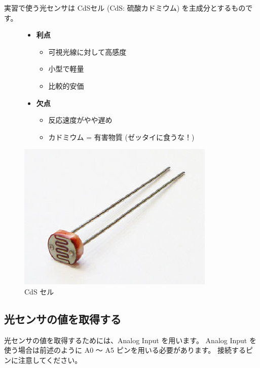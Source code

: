 \documentclass[11pt,a4paper]{jarticle}
\begin{document}
実習で使う光センサは CdSセル (CdS: 硫酸カドミウム) を主成分とするものです。

\begin{figure}[h!]
 \begin{minipage}{0.666\columnwidth}
  \begin{itemize}
   \item \textbf{利点}
	 \begin{itemize}
	  \item 可視光線に対して高感度
	  \item 小型で軽量
	  \item 比較的安価
	 \end{itemize}
   \item \textbf{欠点}
	 \begin{itemize}
	  \item 反応速度がやや遅め
	  \item カドミウム = 有害物質 (ゼッタイに食うな！)
	 \end{itemize}
  \end{itemize}
 \end{minipage}
 \begin{minipage}{0.333\columnwidth}
  \centering
  \includegraphics[width=\columnwidth]{img/cds_cell.eps}
  \caption{CdS セル}
 \end{minipage}
\end{figure}


\subsection*{光センサの値を取得する}
\label{subsection:getLightSensor}
光センサの値を取得するためには、Analog Input を用います。
Analog Input を使う場合は前述のように A0 〜 A5 ピンを用いる必要があります。
接続するピンに注意してください。
\end{document}
